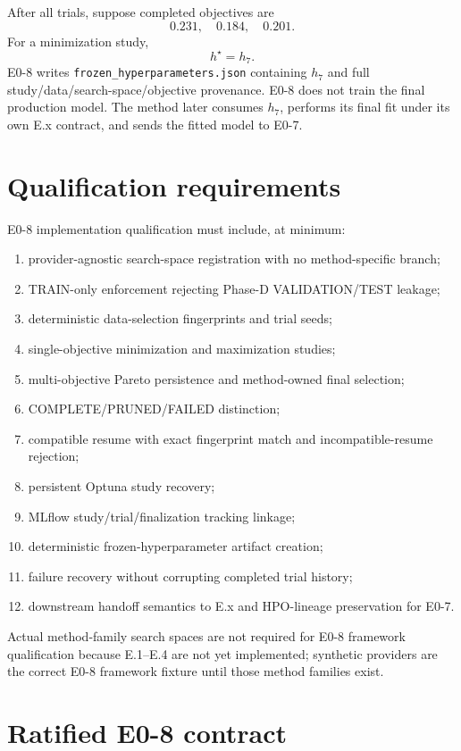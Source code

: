 \documentclass[11pt]{article}
\begin{document}
After all trials, suppose completed objectives are
\[
0.231,\quad 0.184,\quad 0.201.
\]
For a minimization study,
\[
h^{\star}=h_7.
\]
E0-8 writes \texttt{frozen\_hyperparameters.json} containing $h_7$ and full
study/data/search-space/objective provenance. E0-8 does not train the final
production model. The method later consumes $h_7$, performs its final fit under
its own E.x contract, and sends the fitted model to E0-7.

\section{Qualification requirements}

E0-8 implementation qualification must include, at minimum:
\begin{enumerate}[label=\arabic*.]
\item provider-agnostic search-space registration with no method-specific branch;
\item TRAIN-only enforcement rejecting Phase-D VALIDATION/TEST leakage;
\item deterministic data-selection fingerprints and trial seeds;
\item single-objective minimization and maximization studies;
\item multi-objective Pareto persistence and method-owned final selection;
\item COMPLETE/PRUNED/FAILED distinction;
\item compatible resume with exact fingerprint match and incompatible-resume rejection;
\item persistent Optuna study recovery;
\item MLflow study/trial/finalization tracking linkage;
\item deterministic frozen-hyperparameter artifact creation;
\item failure recovery without corrupting completed trial history;
\item downstream handoff semantics to E.x and HPO-lineage preservation for E0-7.
\end{enumerate}
Actual method-family search spaces are not required for E0-8 framework
qualification because E.1--E.4 are not yet implemented; synthetic providers are
the correct E0-8 framework fixture until those method families exist.

\section{Ratified E0-8 contract}
\end{document}
